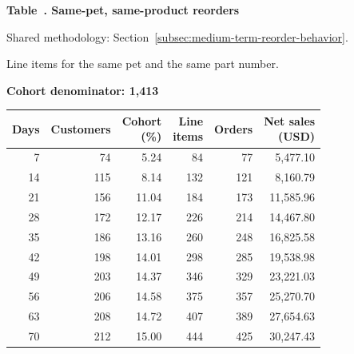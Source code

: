 \label{tab:financial-opportunity-new-chewy-follow-up}
\par\smallskip\noindent\parbox[t][2\baselineskip][t]{\linewidth}{\raggedright\textbf{Table~\thetable. Same-pet, same-product reorders}}
\par\raggedright\footnotesize Shared methodology: Section~\ref{subsec:medium-term-reorder-behavior}.
\par\noindent\parbox[t][2\baselineskip][t]{\linewidth}{\raggedright Line items for the same pet and the same part number.}
\par\noindent\textbf{Cohort denominator: 1,413}
\par\centering\footnotesize
\setlength{\tabcolsep}{2pt}
\begin{tabular}{rrrrrr}\toprule
Days & Customers & \shortstack{Cohort\\(\%)} & \shortstack{Line\\items} & Orders & \shortstack{Net sales\\(USD)} \\ \midrule
7 & 74 & 5.24 & 84 & 77 & 5,477.10 \\
14 & 115 & 8.14 & 132 & 121 & 8,160.79 \\
21 & 156 & 11.04 & 184 & 173 & 11,585.96 \\
28 & 172 & 12.17 & 226 & 214 & 14,467.80 \\
35 & 186 & 13.16 & 260 & 248 & 16,825.58 \\
42 & 198 & 14.01 & 298 & 285 & 19,538.98 \\
49 & 203 & 14.37 & 346 & 329 & 23,221.03 \\
56 & 206 & 14.58 & 375 & 357 & 25,270.70 \\
63 & 208 & 14.72 & 407 & 389 & 27,654.63 \\
70 & 212 & 15.00 & 444 & 425 & 30,247.43 \\
\bottomrule\end{tabular}\par
